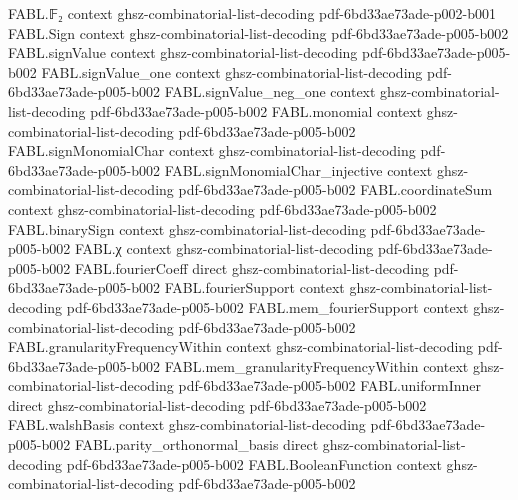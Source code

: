 \begin{theorem}
\label{FABL.vectorFourierCoeff_eq_expect}
\leanok
{}
\proofstep
  {FABL.𝔽₂}
  {context}
  {ghsz-combinatorial-list-decoding}
  {pdf-6bd33ae73ade-p002-b001}
\proofstep
  {FABL.Sign}
  {context}
  {ghsz-combinatorial-list-decoding}
  {pdf-6bd33ae73ade-p005-b002}
\proofstep
  {FABL.signValue}
  {context}
  {ghsz-combinatorial-list-decoding}
  {pdf-6bd33ae73ade-p005-b002}
\proofstep
  {FABL.signValue_one}
  {context}
  {ghsz-combinatorial-list-decoding}
  {pdf-6bd33ae73ade-p005-b002}
\proofstep
  {FABL.signValue_neg_one}
  {context}
  {ghsz-combinatorial-list-decoding}
  {pdf-6bd33ae73ade-p005-b002}
\proofstep
  {FABL.monomial}
  {context}
  {ghsz-combinatorial-list-decoding}
  {pdf-6bd33ae73ade-p005-b002}
\proofstep
  {FABL.signMonomialChar}
  {context}
  {ghsz-combinatorial-list-decoding}
  {pdf-6bd33ae73ade-p005-b002}
\proofstep
  {FABL.signMonomialChar_injective}
  {context}
  {ghsz-combinatorial-list-decoding}
  {pdf-6bd33ae73ade-p005-b002}
\proofstep
  {FABL.coordinateSum}
  {context}
  {ghsz-combinatorial-list-decoding}
  {pdf-6bd33ae73ade-p005-b002}
\proofstep
  {FABL.binarySign}
  {context}
  {ghsz-combinatorial-list-decoding}
  {pdf-6bd33ae73ade-p005-b002}
\proofstep
  {FABL.χ}
  {context}
  {ghsz-combinatorial-list-decoding}
  {pdf-6bd33ae73ade-p005-b002}
\proofstep
  {FABL.fourierCoeff}
  {direct}
  {ghsz-combinatorial-list-decoding}
  {pdf-6bd33ae73ade-p005-b002}
\proofstep
  {FABL.fourierSupport}
  {context}
  {ghsz-combinatorial-list-decoding}
  {pdf-6bd33ae73ade-p005-b002}
\proofstep
  {FABL.mem_fourierSupport}
  {context}
  {ghsz-combinatorial-list-decoding}
  {pdf-6bd33ae73ade-p005-b002}
\proofstep
  {FABL.granularityFrequencyWithin}
  {context}
  {ghsz-combinatorial-list-decoding}
  {pdf-6bd33ae73ade-p005-b002}
\proofstep
  {FABL.mem_granularityFrequencyWithin}
  {context}
  {ghsz-combinatorial-list-decoding}
  {pdf-6bd33ae73ade-p005-b002}
\proofstep
  {FABL.uniformInner}
  {direct}
  {ghsz-combinatorial-list-decoding}
  {pdf-6bd33ae73ade-p005-b002}
\proofstep
  {FABL.walshBasis}
  {context}
  {ghsz-combinatorial-list-decoding}
  {pdf-6bd33ae73ade-p005-b002}
\proofstep
  {FABL.parity_orthonormal_basis}
  {direct}
  {ghsz-combinatorial-list-decoding}
  {pdf-6bd33ae73ade-p005-b002}
\proofstep
  {FABL.BooleanFunction}
  {context}
  {ghsz-combinatorial-list-decoding}
  {pdf-6bd33ae73ade-p005-b002}

\end{theorem}
